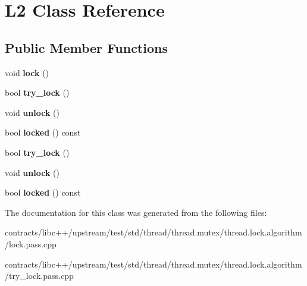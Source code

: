 \hypertarget{class_l2}{}\section{L2 Class Reference}
\label{class_l2}
\subsection*{Public Member Functions}
\begin{DoxyCompactItemize}
\item 
\mbox{\label{class_l2_afff8910463e47e3b52ecce5d946eecab}} 
void {\bfseries lock} ()
\item 
\mbox{\label{class_l2_a727d35f139c702a1965c7921e8bfc65c}} 
bool {\bfseries try\+\_\+lock} ()
\item 
\mbox{\label{class_l2_a2f917d0ee68e813a512ff912099c76bd}} 
void {\bfseries unlock} ()
\item 
\mbox{\label{class_l2_a5a7414d33151aaf995a4007928fb0d39}} 
bool {\bfseries locked} () const
\item 
\mbox{\label{class_l2_a727d35f139c702a1965c7921e8bfc65c}} 
bool {\bfseries try\+\_\+lock} ()
\item 
\mbox{\label{class_l2_a2f917d0ee68e813a512ff912099c76bd}} 
void {\bfseries unlock} ()
\item 
\mbox{\label{class_l2_a5a7414d33151aaf995a4007928fb0d39}} 
bool {\bfseries locked} () const
\end{DoxyCompactItemize}


The documentation for this class was generated from the following files\+:\begin{DoxyCompactItemize}
\item 
contracts/libc++/upstream/test/std/thread/thread.\+mutex/thread.\+lock.\+algorithm/lock.\+pass.\+cpp\item 
contracts/libc++/upstream/test/std/thread/thread.\+mutex/thread.\+lock.\+algorithm/try\+\_\+lock.\+pass.\+cpp\end{DoxyCompactItemize}
